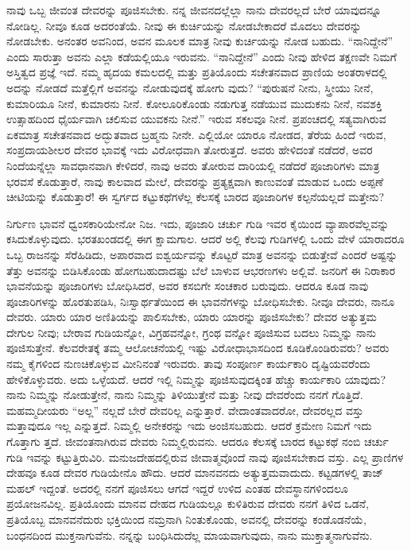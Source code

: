 ನಾವು ಒಬ್ಬ ಜೀವಂತ ದೇವರನ್ನು ಪೂಜಿಸಬೇಕು. ನನ್ನ ಜೀವನದಲ್ಲೆಲ್ಲಾ ನಾನು ದೇವರಲ್ಲದೆ ಬೇರೆ ಯಾವುದನ್ನೂ ನೋಡಿಲ್ಲ. ನೀವೂ ಕೂಡ ಅದರಂತೆಯೆ. ನೀವು ಈ ಕುರ್ಚಿಯನ್ನು ನೋಡಬೇಕಾದರೆ ಮೊದಲು ದೇವರನ್ನು ನೋಡಬೇಕು. ಅನಂತರ ಅವನಿಂದ, ಅವನ ಮೂಲಕ ಮಾತ್ರ ನೀವು ಕುರ್ಚಿಯನ್ನು ನೋಡ ಬಹುದು. “ನಾನಿದ್ದೇನೆ” ಎಂದು ಸಾರುತ್ತಾ ಅವನು ಎಲ್ಲಾ ಕಡೆಯಲ್ಲಿಯೂ ಇರುವನು. “ನಾನಿದ್ದೇನೆ” ಎಂದು ನೀವು ಹೇಳಿದ ತಕ್ಷಣವೇ ನಿಮಗೆ ಅಸ್ತಿತ್ವದ ಪ್ರಜ್ಞೆ ಇದೆ. ನಮ್ಮ ಹೃದಯ ಕಮಲದಲ್ಲಿ ಮತ್ತು ಪ್ರತಿಯೊಂದು ಸಚೇತನವಾದ ಪ್ರಾಣಿಯ ಅಂತರಾಳದಲ್ಲಿ ಅದನ್ನು ನೋಡದೆ ಮತ್ತೆಲ್ಲಿಗೆ ಅವನನ್ನು ನೋಡುವುದಕ್ಕೆ ಹೋಗು ವುದು? “ಪುರುಷನೆ ನೀನು, ಸ್ತ್ರೀಯು ನೀನೆ, ಕುಮಾರಿಯೂ ನೀನೆ, ಕುಮಾರನು ನೀನೆ. ಕೋಲೂರಿಕೊಂಡು ನಡುಗುತ್ತ ನಡೆಯುವ ಮುದುಕನು ನೀನೆ, ನವಶಕ್ತಿ ಉತ್ಸಾಹದಿಂದ ಧೈರ್ಯವಾಗಿ ಚಲಿಸುವ ಯುವಕನು ನೀನೆ.” ಇರುವ ಸಕಲವೂ ನೀನೆ. ಪ್ರಪಂಚದಲ್ಲಿ ಸತ್ಯವಾಗಿರುವ ಏಕಮಾತ್ರ ಸಚೇತನವಾದ ಅದ್ಭುತವಾದ ಬ್ರಹ್ಮನು ನೀನೇ. ಎಲ್ಲಿಯೋ ಯಾರೂ ನೋಡದ, ತೆರೆಯ ಹಿಂದೆ ಇರುವ, ಸಂಪ್ರದಾಯಶೀಲರ ದೇವರ ಭಾವಕ್ಕೆ ಇದು ವಿರೋಧವಾಗಿ ತೋರುತ್ತದೆ. ಅವರು ಹೇಳಿದಂತೆ ನಡೆದರೆ, ಅವರ ನಿಂದೆಯನ್ನೆಲ್ಲಾ ಸಾವಧಾನವಾಗಿ ಕೇಳಿದರೆ, ನಾವು ಅವರು ತೋರುವ ದಾರಿಯಲ್ಲಿ ನಡೆದರೆ ಪೂಜಾರಿಗಳು ಮಾತ್ರ ಭರವಸೆ ಕೊಡುತ್ತಾರೆ, ನಾವು ಕಾಲವಾದ ಮೇಲೆ, ದೇವರನ್ನು ಪ್ರತ್ಯಕ್ಷವಾಗಿ ಕಾಣುವಂತೆ ಮಾಡುವ ಒಂದು ಅಪ್ಪಣೆ ಚೀಟಿಯನ್ನು ಕೊಡುತ್ತಾರೆ! ಈ ಸ್ವರ್ಗದ ಕಟ್ಟುಕಥೆಗಳೆಲ್ಲ ಕೆಲಸಕ್ಕೆ ಬಾರದ ಪೂಜಾರಿಗಳ ಕಲ್ಪನೆಯಲ್ಲದೆ ಮತ್ತೇನು?

ನಿರ್ಗುಣ ಭಾವನೆ ಧ್ವಂಸಕಾರಿಯೇನೋ ನಿಜ. ಇದು, ಪೂಜಾರಿ ಚರ್ಚು ಗುಡಿ ಇವರ ಕೈಯಿಂದ ವ್ಯಾಪಾರವೆಲ್ಲವನ್ನು ಕಸಿದುಕೊಳ್ಳುವುದು. ಭರತಖಂಡದಲ್ಲಿ ಈಗ ಕ್ಷಾಮಗಾಲ. ಆದರೆ ಅಲ್ಲಿ ಕೆಲವು ಗುಡಿಗಳಲ್ಲಿ ಒಂದು ವೇಳೆ ಯಾರಾದರೂ ಒಬ್ಬ ರಾಜನನ್ನು ಸೆರೆಹಿಡಿದು, ಅಪಾರವಾದ ಐಶ್ವರ್ಯವನ್ನು ಕೊಟ್ಟರೆ ಮಾತ್ರ ಅವನನ್ನು ಬಿಡುತ್ತೇವೆ ಎಂದರೆ ಅಷ್ಟನ್ನು ತೆತ್ತು ಅವನನ್ನು ಬಿಡಿಸಿಕೊಂಡು ಹೋಗಬಹುದಾದಷ್ಟು ಬೆಲೆ ಬಾಳುವ ಆಭರಣಗಳು ಅಲ್ಲಿವೆ. ಜನರಿಗೆ ಈ ನಿರಾಕಾರ ಭಾವನೆಯನ್ನು ಪೂಜಾರಿಗಳು ಬೋಧಿಸಿದರೆ, ಅವರ ಕಸಬಿಗೇ ಸಂಚಕಾರ ಬರುವುದು. ಆದರೂ ಕೂಡ ನಾವು ಪೂಜಾರಿಗಳನ್ನು ಹೊರತುಪಡಿಸಿ, ನಿಃಸ್ವಾರ್ಥತೆಯಿಂದ ಈ ಭಾವನೆಗಳನ್ನು ಬೋಧಿಸಬೇಕು. ನೀವೂ ದೇವರು, ನಾನೂ ದೇವರು. ಯಾರು ಯಾರ ಅಣಿತಿಯನ್ನು ಪಾಲಿಸಬೇಕು, ಯಾರು ಯಾರನ್ನು ಪೂಜಿಸಬೇಕು? ದೇವರ ಅತ್ಯುತ್ತಮ ದೇಗುಲ ನೀವು; ಬೇರಾವ ಗುಡಿಯನ್ನೋ, ವಿಗ್ರಹವನ್ನೋ, ಗ್ರಂಥ ವನ್ನೋ ಪೂಜಿಸುವ ಬದಲು ನಿಮ್ಮನ್ನು ನಾನು ಪೂಜಿಸುತ್ತೇನೆ. ಕೆಲವರೇತಕ್ಕೆ ತಮ್ಮ ಆಲೋಚನೆಯಲ್ಲಿ ಇಷ್ಟು ವಿರೋಧಾಭಾಸದಿಂದ ಕೂಡಿಕೊಂಡಿರುವರು? ಅವರು ನಮ್ಮ ಕೈಗಳಿಂದ ನುಣಚಿಕೊಳ್ಳುವ ಮೀನಿನಂತೆ ಇರುವರು. ತಾವು ಸಂಪೂರ್ಣ ಕಾರ್ಯಕಾರಿ ದೃಷ್ಟಿಯವರೆಂದು ಹೇಳಿಕೊಳ್ಳುವರು. ಅದು ಒಳ್ಳೆಯದೆ. ಆದರೆ ಇಲ್ಲಿ ನಿಮ್ಮನ್ನು ಪೂಜಿಸುವುದಕ್ಕಿಂತ ಹೆಚ್ಚು ಕಾರ್ಯಕಾರಿ ಯಾವುದು? ನಾನು ನಿಮ್ಮನ್ನು ನೋಡುತ್ತೇನೆ, ನಾನು ನಿಮ್ಮನ್ನು ತಿಳಿಯುತ್ತೇನೆ ಮತ್ತು ನೀವು ದೇವರೆಂದು ನನಗೆ ಗೊತ್ತಿದೆ. ಮಹಮ್ಮದೀಯರು “ಅಲ್ಲ” ನಲ್ಲದೆ ಬೇರೆ ದೇವರಿಲ್ಲ ಎನ್ನುತ್ತಾರೆ. ವೇದಾಂತವಾದರೋ, ದೇವರಲ್ಲದ ವಸ್ತು ಮತ್ತಾವುದೂ ಇಲ್ಲ ಎನ್ನುತ್ತದೆ. ನಿಮ್ಮಲ್ಲಿ ಅನೇಕರನ್ನು ಇದು ಅಂಜಿಸಬಹುದು. ಆದರೆ ಕ್ರಮೇಣ ನಿಮಗೆ ಇದು ಗೊತ್ತಾಗು ತ್ತದೆ. ಜೀವಂತನಾಗಿರುವ ದೇವರು ನಿಮ್ಮಲ್ಲಿರುವನು. ಆದರೂ ಕೆಲಸಕ್ಕೆ ಬಾರದ ಕಟ್ಟುಕಥೆ ನಂಬಿ ಚರ್ಚು ಗುಡಿ ಇವನ್ನು ಕಟ್ಟುತ್ತಿರುವಿರಿ. ಮನುಜದೇಹದಲ್ಲಿರುವ ಜೀವಾತ್ಮವೊಂದೆ ನಾವು ಪೂಜಿಸಬೇಕಾದ ವಸ್ತು. ಎಲ್ಲ ಪ್ರಾಣಿಗಳ ದೇಹವೂ ಕೂಡ ದೇವರ ಗುಡಿಯೇನೊ ಹೌದು. ಆದರೆ ಮಾನವನದು ಅತ್ಯುತ್ತಮವಾದುದು. ಕಟ್ಟಡಗಳಲ್ಲಿ ತಾಜ್​ ಮಹಲ್​ ಇದ್ದಂತೆ. ಅದರಲ್ಲಿ ನನಗೆ ಪೂಜಿಸಲು ಆಗದೆ ಇದ್ದರೆ ಉಳಿದ ಎಂತಹ ದೇವಸ್ಥಾನಗಳಿಂದಲೂ ಪ್ರಯೋಜನವಿಲ್ಲ. ಪ್ರತಿಯೊಂದು ಮಾನವ ದೇಹದ ಗುಡಿಯಲ್ಲೂ ಕುಳಿತಿರುವ ದೇವರು ನನಗೆ ತಿಳಿದ ಒಡನೆ, ಪ್ರತಿಯೊಬ್ಬ ಮಾನವನೆದುರು ಭಕ್ತಿಯಿಂದ ನಮ್ರನಾಗಿ ನಿಂತುಕೊಂಡು, ಅವನಲ್ಲಿ ದೇವರನ್ನು ಕಂಡೊಡನೆಯೆ, ಬಂಧನದಿಂದ ಮುಕ್ತನಾಗುವೆನು. ನನ್ನನ್ನು ಬಂಧಿಸಿದುದೆಲ್ಲ ಮಾಯವಾಗುವುದು, ನಾನು ಮುಕ್ತಾತ್ಮನಾಗುವೆನು.

